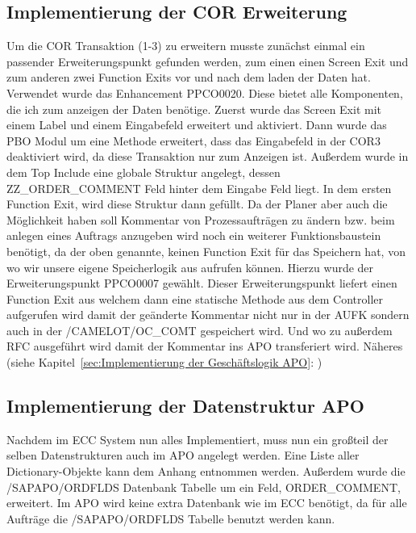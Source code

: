 \subsection{Implementierung der COR Erweiterung}
\label{sec:Implementierung der COR Erweiterung}   
Um die COR Transaktion (1-3) zu erweitern musste zunächst einmal ein passender Erweiterungspunkt gefunden werden, zum einen einen Screen Exit und zum anderen zwei Function Exits vor und nach dem laden der Daten hat. Verwendet wurde das Enhancement PPCO0020. Diese bietet alle Komponenten, die ich zum anzeigen der Daten benötige. Zuerst wurde das Screen Exit mit einem Label und einem Eingabefeld erweitert und aktiviert. Dann wurde das \ac{PBO} Modul um eine Methode erweitert, dass das Eingabefeld in der COR3 deaktiviert wird, da diese Transaktion nur zum Anzeigen ist. Außerdem wurde in dem Top Include eine globale Struktur angelegt, dessen ZZ\_ORDER\_COMMENT Feld hinter dem Eingabe Feld liegt. In dem ersten Function Exit, wird diese Struktur dann gefüllt. Da der Planer aber auch die Möglichkeit haben soll Kommentar von Prozessaufträgen zu ändern bzw. beim anlegen eines Auftrags anzugeben wird noch ein weiterer Funktionsbaustein benötigt, da der oben genannte, keinen Function Exit für das Speichern hat, von wo wir unsere eigene Speicherlogik aus aufrufen können. Hierzu wurde der Erweiterungspunkt PPCO0007 gewählt. Dieser Erweiterungspunkt liefert einen Function Exit aus welchem dann eine statische Methode aus dem Controller aufgerufen wird damit der geänderte Kommentar nicht nur in der AUFK sondern auch in der /CAMELOT/OC\_COMT gespeichert wird. Und wo zu außerdem \ac{RFC} ausgeführt wird damit der Kommentar ins \ac{APO} transferiert wird. Näheres (siehe Kapitel~\ref{sec:Implementierung der Geschäftslogik APO}: )

\subsection{Implementierung der Datenstruktur APO}
\label{sec:Implementierung der Datenstruktur APO} 
Nachdem im \ac{ECC} System nun alles Implementiert, muss nun ein großteil der selben Datenstrukturen auch im \ac{APO} angelegt werden. Eine Liste aller Dictionary-Objekte kann dem Anhang entnommen werden. Außerdem wurde die /SAPAPO/ORDFLDS Datenbank Tabelle um ein Feld, ORDER\_COMMENT, erweitert. Im \ac{APO} wird keine extra Datenbank wie im \ac{ECC} benötigt, da für alle Aufträge die /SAPAPO/ORDFLDS Tabelle benutzt werden kann.

